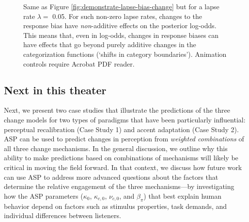 \documentclass[
  11pt,
  english,
  man,floatsintext]{apa6}
\begin{document}
\begin{figure}

{\centering {}

}

\caption[Same as Figure \ref{fig:demonstrate-lapse-bias-change} but for a lapse rate \(\lambda=\) 0.05. For such non-zero lapse rates, changes to the response bias have \emph{non}-additive effects on the posterior log-odds. This means that, even in log-odds, changes in response biases can have effects that go beyond purely additive changes in the categorization functions (`shifts in category boundaries'). Animation controls require Acrobat PDF reader.]{Same as Figure \ref{fig:demonstrate-lapse-bias-change} but for a lapse rate \(\lambda=\) 0.05. For such non-zero lapse rates, changes to the response bias have \emph{non}-additive effects on the posterior log-odds. This means that, even in log-odds, changes in response biases can have effects that go beyond purely additive changes in the categorization functions (`shifts in category boundaries'). Animation controls require Acrobat PDF reader.}\label{fig:demonstrate-lapse-bias-change-nonzero-lapse}
\end{figure}

\hypertarget{next-in-this-theater}{%
\subsection{Next in this theater}\label{next-in-this-theater}}

Next, we present two case studies that illustrate the predictions of the three change models for two types of paradigms that have been particularly influential: perceptual recalibration (Case Study 1) and accent adaptation (Case Study 2). ASP can be used to predict changes in perception from \emph{weighted combinations} of all three change mechanisms. In the general discussion, we outline why this ability to make predictions based on combinations of mechanisms will likely be critical in moving the field forward. In that context, we discuss how future work can use ASP to address more advanced questions about the factors that determine the relative engagement of the three mechanisms---by investigating how the ASP parameters (\(\kappa_0\), \(\kappa_{c,0}\), \(\nu_{c,0}\), and \(\beta_{\pi}\)) that best explain human behavior depend on factors such as stimulus properties, task demands, and individual differences between listeners.
\end{document}

